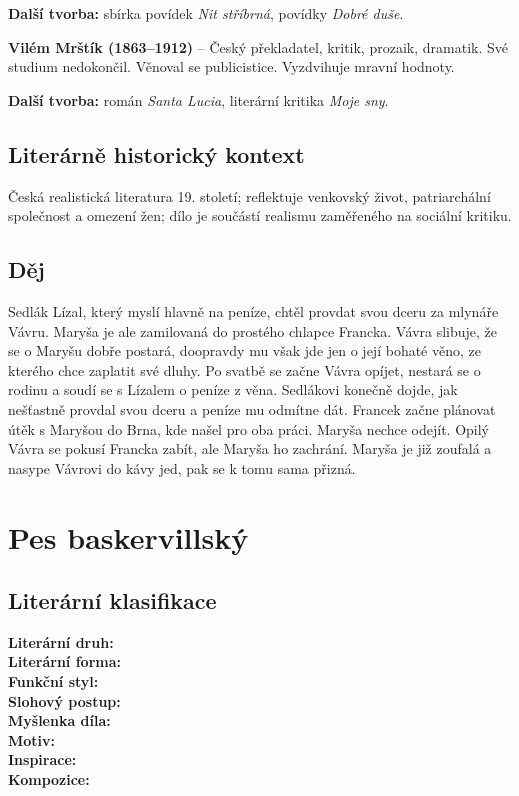 \documentclass[12pt, a4paper]{article}
\newcommand{\mybf}[1]{\textcolor[RGB]{0, 179, 219}{\textbf{#1}}}
\begin{document}
\textbf{Další tvorba:} sbírka povídek \textit{Nit stříbrná}, povídky \textit{Dobré duše}.

\textbf{Vilém Mrštík (1863--1912)} -- Český překladatel, kritik, prozaik, dramatik. Své studium nedokončil. Věnoval se publicistice. Vyzdvihuje mravní hodnoty.

\textbf{Další tvorba:} román \textit{Santa Lucia}, literární kritika \textit{Moje sny}.

\subsection*{Literárně historický kontext}
Česká realistická literatura 19. století; reflektuje venkovský život, patriarchální společnost a omezení žen; dílo je součástí realismu zaměřeného na sociální kritiku.

{\color{subsectioncolor}\hrulefill}
\subsection*{\color{subsectioncolor}Děj}
Sedlák Lízal, který myslí hlavně na peníze, chtěl provdat svou dceru za mlynáře Vávru. Maryša je ale zamilovaná do prostého chlapce Francka. Vávra slibuje, že se o Maryšu dobře postará, doopravdy mu však jde jen o její bohaté věno, ze kterého chce zaplatit své dluhy. Po svatbě se začne Vávra opíjet, nestará se o rodinu a soudí se s Lízalem o peníze z věna. Sedlákovi konečně dojde, jak nešťastně provdal svou dceru a peníze mu odmítne dát. Francek začne plánovat útěk s Maryšou do Brna, kde našel pro oba práci. Maryša nechce odejít. Opilý Vávra se pokusí Francka zabít, ale Maryša ho zachrání. Maryša je již zoufalá a nasype Vávrovi do kávy jed, pak se k tomu sama přizná.

\newpage

\section{Pes baskervillský}

\subsection*{Literární klasifikace}
\mybf{Literární druh:} \\[3pt]
\mybf{Literární forma:} \\[3pt]
\mybf{Funkční styl:} \\[3pt]
\mybf{Slohový postup:} \\[10pt]
\mybf{Myšlenka díla:} \\[10pt]
\mybf{Motiv:} \\[10pt]
\mybf{Inspirace:} \\[10pt]
\mybf{Kompozice:} 
\end{document}
